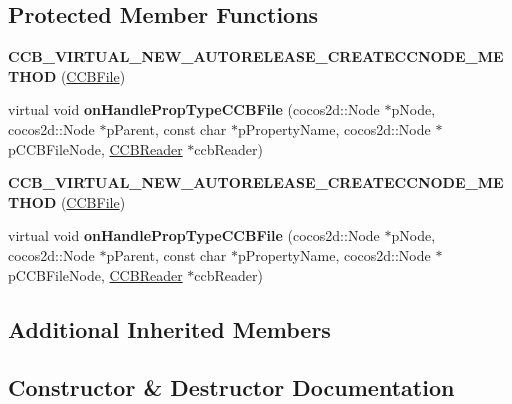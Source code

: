 \subsection*{Protected Member Functions}
\begin{DoxyCompactItemize}
\item 
\mbox{\label{classcocosbuilder_1_1CCBFileLoader_aecc93c168e72596a51c2ae50d5b36328}} 
{\bfseries C\+C\+B\+\_\+\+V\+I\+R\+T\+U\+A\+L\+\_\+\+N\+E\+W\+\_\+\+A\+U\+T\+O\+R\+E\+L\+E\+A\+S\+E\+\_\+\+C\+R\+E\+A\+T\+E\+C\+C\+N\+O\+D\+E\+\_\+\+M\+E\+T\+H\+OD} (\hyperlink{classcocosbuilder_1_1CCBFile}{C\+C\+B\+File})
\item 
\mbox{\label{classcocosbuilder_1_1CCBFileLoader_adcd4b46f0c5dd726f33e747c57854f4f}} 
virtual void {\bfseries on\+Handle\+Prop\+Type\+C\+C\+B\+File} (cocos2d\+::\+Node $\ast$p\+Node, cocos2d\+::\+Node $\ast$p\+Parent, const char $\ast$p\+Property\+Name, cocos2d\+::\+Node $\ast$p\+C\+C\+B\+File\+Node, \hyperlink{classcocosbuilder_1_1CCBReader}{C\+C\+B\+Reader} $\ast$ccb\+Reader)
\item 
\mbox{\label{classcocosbuilder_1_1CCBFileLoader_aecc93c168e72596a51c2ae50d5b36328}} 
{\bfseries C\+C\+B\+\_\+\+V\+I\+R\+T\+U\+A\+L\+\_\+\+N\+E\+W\+\_\+\+A\+U\+T\+O\+R\+E\+L\+E\+A\+S\+E\+\_\+\+C\+R\+E\+A\+T\+E\+C\+C\+N\+O\+D\+E\+\_\+\+M\+E\+T\+H\+OD} (\hyperlink{classcocosbuilder_1_1CCBFile}{C\+C\+B\+File})
\item 
\mbox{\label{classcocosbuilder_1_1CCBFileLoader_a414098ad2deaf77bb62ba72aca394e9a}} 
virtual void {\bfseries on\+Handle\+Prop\+Type\+C\+C\+B\+File} (cocos2d\+::\+Node $\ast$p\+Node, cocos2d\+::\+Node $\ast$p\+Parent, const char $\ast$p\+Property\+Name, cocos2d\+::\+Node $\ast$p\+C\+C\+B\+File\+Node, \hyperlink{classcocosbuilder_1_1CCBReader}{C\+C\+B\+Reader} $\ast$ccb\+Reader)
\end{DoxyCompactItemize}
\subsection*{Additional Inherited Members}


\subsection{Constructor \& Destructor Documentation}
\mbox{\label{classcocosbuilder_1_1CCBFileLoader_a360a0b863e7f1f22a28bf3de9678a16d}} 
